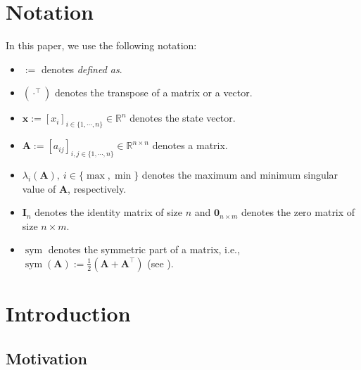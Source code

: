 \documentclass{ifacconf}
\newcommand\ie{\textrm{i.e.,\ }}
\newcommand\R{\mathbb{R}}
\newcommand*{\mv}[1]{\boldsymbol{#1}} %
\newcommand*{\mm}[1]{\boldsymbol{#1}} %
\DeclareMathOperator{\mysym}{sym}       %
\begin{document}
\section*{Notation}

In this paper, we use the following notation:
\begin{itemize}
   \item $:=$ denotes \textit{defined as}.
   \item $(\cdot^\top)$ denotes the transpose of a matrix or a vector.
   \item $\mv{x}:=[x_i]_{i\in\{1,\cdots,n\}}\in\R^n$ denotes the state vector.
   \item $\mm A:=[a_{ij}]_{i,j\in\{1,\cdots,n\}}\in\R^{n\times n}$ denotes a matrix.
   \item $\lambda_{i}(\mm A),\ i\in\{\max,\min\}$ denotes the maximum and minimum singular value of $\mm A$, respectively.
   \item $\mm I_n$ denotes the identity matrix of size $n$ and $\mm 0_{n\times m}$ denotes the zero matrix of size $n\times m$.
   \item $\mysym$ denotes the symmetric part of a matrix, \ie $\mysym(\mm A):=\tfrac{1}{2}(\mm A+\mm A^\top)$ (see \cite{Tsukamoto:2021ac}).
\end{itemize}

\section{Introduction}


\subsection{Motivation}
\end{document}
